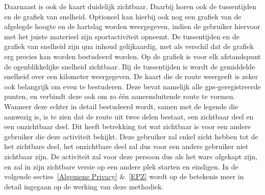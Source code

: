 Daarnaast is ook de kaart duidelijk zichtbaar. Daarbij horen ook de
tussentijden en de grafiek van snelheid. Optioneel kan hierbij ook nog een
grafiek van de afgelegde hoogte en de hartslag worden weergegeven, indien de
gebruiker hiervoor met het juiste materieel zijn sportactiviteit opneemt. De
tussentijden en de grafiek van snelheid zijn qua inhoud gelijkaardig, met als
verschil dat de grafiek erg precies kan worden bestudeerd worden. Op de grafiek
is voor elk afstandspunt de ogenblikkelijke snelheid zichtbaar. Bij de
tussentijden is wordt de gemiddelde snelheid over een kilometer weergegeven. De
kaart die de route weergeeft is zeker ook belangrijk om even te bestuderen.
Deze bevat namelijk alle gps-geregistreerde punten, en verbindt deze ook om zo
één aaneensluitende route te vormen. Wanneer deze echter in detail bestudeerd
wordt, samen met de legende die aanwezig is, is te zien dat de route uit twee
delen bestaat, een zichtbaar deel en een onzichtbaar deel. Dit heeft betrekking
tot wat zichtbaar is voor een andere gebruiker die deze activiteit bekijkt.
Deze gebruiker zal enkel zicht hebben tot de het zichtbare deel, het
onzichtbare deel zal dus voor een andere gebruiker niet zichtbaar zijn. De
activiteit zal voor deze persoon dus als het ware afgekapt zijn, en zal in zijn
zichtbare versie op een andere plek starten en eindigen. In de volgende
secties~\ref{Algemene Privacy} \&~\ref{EPZ} wordt op de betekenis meer in
detail ingegaan op de werking van deze methodiek.

